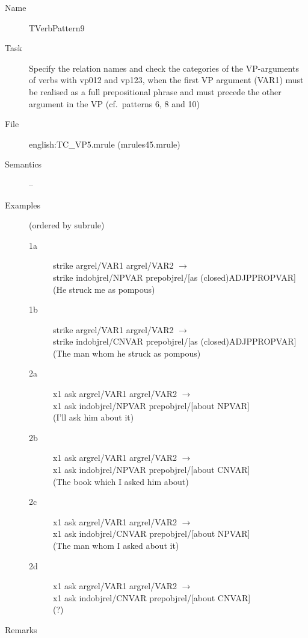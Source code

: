 \begin{description}
\vspace{1 cm}
\begin{description}
\item[Name] TVerbPattern9
\item[Task] Specify the relation names and check the categories of the VP-arguments 
of verbs with vp012 and vp123, when the first VP argument (VAR1) must be realised 
as a full prepositional 
phrase and must precede the other argument in the VP (cf.\ patterns 6, 8 and 10)
\item[File] english:TC\_VP5.mrule (mrules45.mrule)
\item[Semantics] --
\item[Examples] (ordered by subrule)
   \begin{description}
  \item[1a] strike argrel/VAR1 argrel/VAR2 $\rightarrow$ \\
strike    indobjrel/NPVAR prepobjrel/[as (closed)ADJPPROPVAR] \\
(He struck me as pompous)
  \item[1b] strike argrel/VAR1 argrel/VAR2 $\rightarrow$ \\
strike    indobjrel/CNVAR prepobjrel/[as (closed)ADJPPROPVAR] \\
(The man whom he struck as pompous)
  \item[2a] x1 ask argrel/VAR1 argrel/VAR2 $\rightarrow$ \\
x1 ask    indobjrel/NPVAR prepobjrel/[about NPVAR] \\
(I'll ask him about it)
  \item[2b] x1 ask argrel/VAR1 argrel/VAR2 $\rightarrow$ \\
x1 ask    indobjrel/NPVAR prepobjrel/[about CNVAR] \\
(The book which I asked him about)
  \item[2c] x1 ask argrel/VAR1 argrel/VAR2 $\rightarrow$ \\
x1 ask    indobjrel/CNVAR prepobjrel/[about NPVAR] \\
(The man whom I asked about it)
  \item[2d] x1 ask argrel/VAR1 argrel/VAR2 $\rightarrow$ \\
x1 ask    indobjrel/CNVAR prepobjrel/[about CNVAR] \\
(?)
   \end{description}
\item[Remarks]
\end{description}


\end{description}
